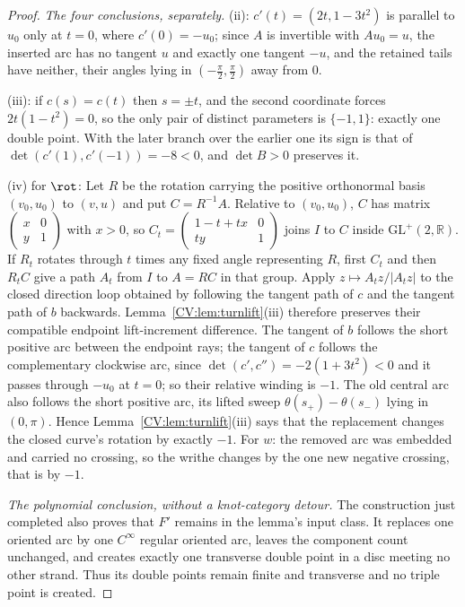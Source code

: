 \begin{proof}
\emph{The four conclusions, separately.} (ii): $c'(t)=(2t,1-3t^2)$ is parallel to
$u_0$ only at $t=0$, where $c'(0)=-u_0$; since $A$ is invertible with
$Au_0=u$, the inserted arc has no tangent $u$ and exactly one tangent $-u$, and
the retained tails have neither, their angles lying in $(-\tfrac\pi2,\tfrac\pi2)$
away from $0$.

(iii): if $c(s)=c(t)$ then $s=\pm t$, and the second coordinate forces
$2t(1-t^2)=0$, so the only pair of distinct parameters is $\{-1,1\}$: exactly
one double point. With the later branch over the earlier one its sign is that of
$\det(c'(1),c'(-1))=-8<0$, and $\det B>0$ preserves it.

(iv) for $\rot$: Let $R$ be the rotation carrying the positive orthonormal basis
$(v_0,u_0)$ to $(v,u)$ and put $C=R^{-1}A$. Relative to $(v_0,u_0)$,
$C$ has matrix
$\left(\begin{smallmatrix}x&0\\y&1\end{smallmatrix}\right)$ with $x>0$, so
$C_t=\left(\begin{smallmatrix}1-t+tx&0\\ty&1\end{smallmatrix}\right)$
joins $I$ to $C$ inside $\mathrm{GL}^+(2,\mathbb R)$. If $R_t$ rotates
through $t$ times any fixed angle representing $R$, first $C_t$ and then
$R_tC$ give a path $A_t$ from $I$ to $A=RC$ in that group. Apply
$z\mapsto A_tz/|A_tz|$ to the closed direction loop obtained by following
the tangent path of $c$ and the tangent path of $b$ backwards.
Lemma~\ref{CV:lem:turnlift}(iii) therefore preserves their compatible endpoint
lift-increment difference. The tangent of $b$ follows the short positive arc between the
endpoint rays; the tangent of $c$ follows the complementary clockwise arc, since
$\det(c',c'')=-2(1+3t^2)<0$ and it passes through $-u_0$ at $t=0$; so their
relative winding is $-1$. The old central arc also follows the short positive
arc, its lifted sweep $\theta(s_+)-\theta(s_-)$ lying in $(0,\pi)$. Hence Lemma~\ref{CV:lem:turnlift}(iii) says that the replacement changes the
closed curve's rotation by exactly $-1$. For
$w$: the removed arc was embedded and carried no crossing, so the writhe changes
by the one new negative crossing, that is by $-1$.

\emph{The polynomial conclusion, without a knot-category detour.}
The construction just completed also proves that $F'$ remains in the lemma's
input class.  It replaces one oriented arc by one $C^\infty$ regular oriented
arc, leaves the component count unchanged, and creates exactly one transverse
double point in a disc meeting no other strand.  Thus its double points remain
finite and transverse and no triple point is created.


\end{proof}
